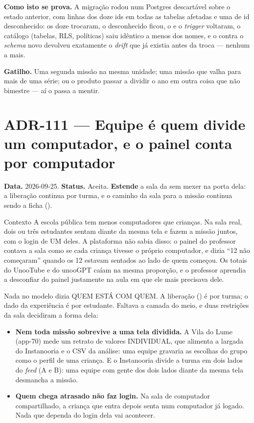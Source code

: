 \textbf{Como isto se prova.} A migração rodou num Postgres descartável sobre o
estado anterior, com linhas dos doze ids em todas as tabelas afetadas e uma de
id desconhecido: os doze trocaram, o desconhecido ficou, o  e o
\emph{trigger} voltaram, o catálogo (tabelas, RLS, políticas) saiu idêntico a
menos dos nomes, e o  contra o \emph{schema} novo
devolveu exatamente o \emph{drift} que já existia antes da troca --- nenhum a
mais.

\textbf{Gatilho.} Uma segunda missão na mesma unidade; uma missão que valha
para mais de uma série; ou o produto passar a dividir o ano em outra coisa que
não bimestre --- aí o  passa a mentir.

\section{ADR-111 --- Equipe é quem divide um computador, e o painel conta por computador}
\label{adr:equipes-na-missao}

\textbf{Data.} 2026-09-25. \textbf{Status.} Aceita.
\textbf{Estende} a sala da  sem mexer na porta dela: a liberação
continua por turma, e o caminho da sala para a missão continua sendo a ficha
().

\begin{especificacao}{Contexto}
A escola pública tem menos computadores que crianças. Na sala real, dois ou três
estudantes sentam diante da mesma tela e fazem a missão juntos, com o login de
UM deles. A plataforma não sabia disso: o painel do professor contava a sala
como se cada criança tivesse o próprio computador, e dizia \enquote{12 não
começaram} quando os 12 estavam sentados ao lado de quem começou. Os totais do
UnooTube e do unooGPT caíam na mesma proporção, e o professor aprendia a
desconfiar do painel justamente na aula em que ele mais precisava dele.

Nada no modelo dizia QUEM ESTÁ COM QUEM. A liberação () é por
turma; o dado da experiência é por estudante. Faltava a camada do meio, e duas
restrições da sala decidiram a forma dela:

\begin{itemize}
  \item \textbf{Nem toda missão sobrevive a uma tela dividida.} A Vila do Lume
    (app-70) mede um retrato de valores INDIVIDUAL, que alimenta a largada do
    Instanooria e o CSV da análise: uma equipe gravaria as escolhas do grupo
    como o perfil de uma criança. E o Instanooria divide a turma em dois lados
    do \emph{feed} (A e B): uma equipe com gente dos dois lados diante da mesma
    tela desmancha a missão.
  \item \textbf{Quem chega atrasado não faz login.} Na sala de computador
    compartilhado, a criança que entra depois senta num computador já logado.
    Nada que dependa do login dela vai acontecer.
\end{itemize}
\end{especificacao}

